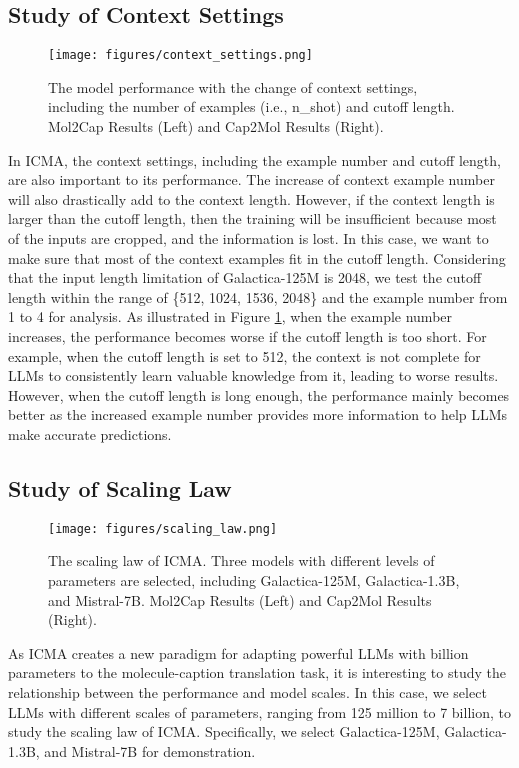 \subsection{Study of Context Settings}
\begin{figure}
    \centering
    \texttt{[image: figures/context\_settings.png]}
    \vskip -0.1in
    \caption{The model performance with the change of context settings, including the number of examples (i.e., n\_shot) and cutoff length. Mol2Cap Results (Left) and Cap2Mol Results (Right).}
    \label{fig:model_length}
    \vskip -0.2in
\end{figure}
In ICMA, the context settings, including the example number and cutoff length, are also important to its performance. The increase of context example number will also drastically add to the context length. However, if the context length is larger than the cutoff length, then the training will be insufficient because most of the inputs are cropped, and the information is lost. 
In this case, we want to make sure that most of the context examples fit in the cutoff length. Considering that the input length limitation of Galactica-125M is 2048, we test the cutoff length within the range of \{512, 1024, 1536, 2048\} and the example number from 1 to 4 for analysis.
As illustrated in Figure \ref{fig:model_length}, when the example number increases, the performance becomes worse if the cutoff length is too short. For example, when the cutoff length is set to 512, the context is not complete for LLMs to consistently learn valuable knowledge from it, leading to worse results. However, when the cutoff length is long enough, the performance mainly becomes better as the increased example number provides more information to help LLMs make accurate predictions.

\subsection{Study of Scaling Law}
\begin{figure}
    \centering
    \texttt{[image: figures/scaling\_law.png]}
    \caption{The scaling law of ICMA. Three models with different levels of parameters are selected, including Galactica-125M, Galactica-1.3B, and Mistral-7B. Mol2Cap Results (Left) and Cap2Mol Results (Right).}
    \vskip -0.1in
    \label{fig:model_scale}
\end{figure}
As ICMA creates a new paradigm for adapting powerful LLMs with billion parameters to the molecule-caption translation task, it is interesting to study the relationship between the performance and model scales. In this case, we select LLMs with different scales of parameters, ranging from 125 million to 7 billion, to study the scaling law of ICMA. Specifically, we select Galactica-125M, Galactica-1.3B, and Mistral-7B for demonstration.

